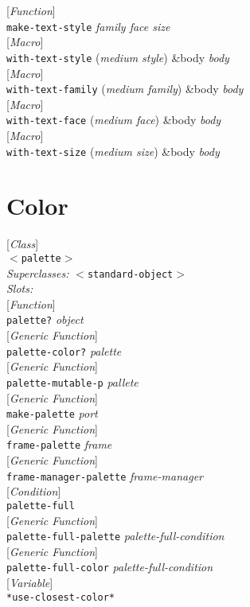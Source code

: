 \documentclass[10pt]{book}
\newenvironment{defother}[2]{[\textit{#1}]\\\texttt{#2}}{\\}
\newenvironment{defun}[1]{\begin{defother}{Function}{#1}}{\end{defother}}
\newenvironment{defgeneric}[1]{\begin{defother}{Generic Function}{#1}}{\end{defother}}
\newenvironment{defmacro}[1]{\begin{defother}{Macro}{#1}}{\end{defother}}
\newenvironment{defvar}[1]{\begin{defother}{Variable}{#1}}{\end{defother}}
\newenvironment{defclass}[2]{[\textit{Class}]\\\texttt{#1}\\\textit{Superclasses:} \texttt{#2}\\\textit{Slots:}}{\\}
\newenvironment{condition}[1]{\begin{defother}{Condition}{#1}}{\end{defother}}
\begin{document}
\begin{defun}{make-text-style} \textit{family face size}\end{defun}
\begin{defmacro}{with-text-style} (\textit{medium style}) \&body \textit{body}\end{defmacro}
\begin{defmacro}{with-text-family} (\textit{medium family}) \&body \textit{body}\end{defmacro}
\begin{defmacro}{with-text-face} (\textit{medium face}) \&body \textit{body}\end{defmacro}
\begin{defmacro}{with-text-size} (\textit{medium size}) \&body \textit{body}\end{defmacro}
\section{Color}
\begin{defclass}{$<$palette$>$}{$<$standard-object$>$}\end{defclass}
\begin{defun}{palette?} \textit{object} \end{defun}
\begin{defgeneric}{palette-color?} \textit{palette} \end{defgeneric}
\begin{defgeneric}{palette-mutable-p} \textit{pallete} \end{defgeneric}
\begin{defgeneric}{make-palette} \textit{port}\end{defgeneric}
\begin{defgeneric}{frame-palette} \textit{frame}\end{defgeneric}
\begin{defgeneric}{frame-manager-palette} \textit{frame-manager}\end{defgeneric}
\begin{condition}{palette-full}\end{condition}
\begin{defgeneric}{palette-full-palette} \textit{palette-full-condition}\end{defgeneric}
\begin{defgeneric}{palette-full-color} \textit{palette-full-condition}\end{defgeneric}
\begin{defvar}{*use-closest-color*}\end{defvar}
\end{document}
